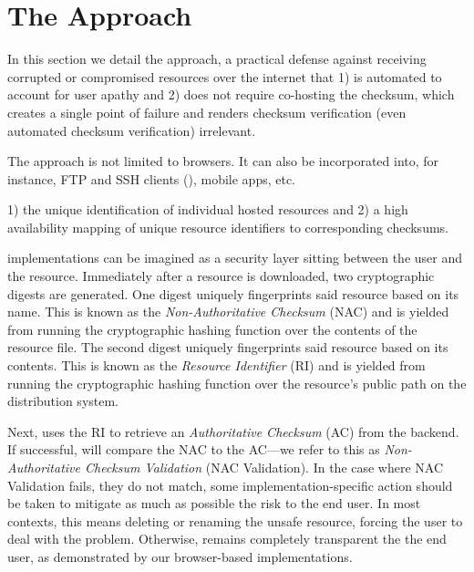 \section{The \SYSTEM{} Approach} \label{sec:approach}

In this section we detail the \SYSTEM{} approach, a practical defense against
receiving corrupted or compromised resources over the internet that 1) is
automated to account for user apathy and 2) does not require co-hosting the
checksum, which creates a single point of failure and renders checksum
verification (even automated checksum verification) irrelevant.

The \SYSTEM{} approach is not limited to browsers. It can also be incorporated
into, for instance, FTP and SSH clients (), mobile apps, etc.

 1) the unique identification
of individual hosted resources and 2) a high availability mapping of unique
resource identifiers to corresponding checksums.

\SYSTEM{} implementations can be imagined as a security layer sitting between
the user and the resource. Immediately after a resource is downloaded, two
cryptographic digests are generated. One digest uniquely fingerprints said
resource based on its name. This is known as the \emph{Non-Authoritative
Checksum} (NAC) and is yielded from running the cryptographic hashing function
over the contents of the resource file. The second digest uniquely fingerprints
said resource based on its contents. This is known as the \emph{Resource
Identifier} (RI) and is yielded from running the cryptographic hashing function
over the resource's public path on the distribution system.

Next, \SYSTEM{} uses the RI to retrieve an \emph{Authoritative Checksum} (AC)
from the backend. If successful, \SYSTEM{} will compare the NAC to the AC---we
refer to this as \emph{Non-Authoritative Checksum Validation} (NAC Validation).
In the case where NAC Validation fails, \ie they do not match, some
implementation-specific action should be taken to mitigate as much as possible
the risk to the end user. In most contexts, this means deleting or renaming the
unsafe resource, forcing the user to deal with the problem. Otherwise, \SYSTEM{}
remains completely transparent the the end user, as demonstrated by our
browser-based implementations.


